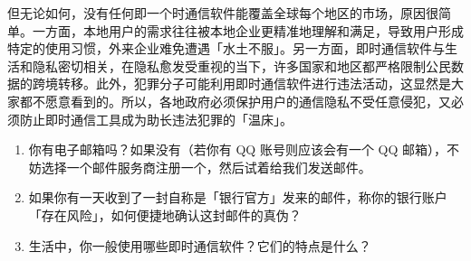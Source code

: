 但无论如何，没有任何即一个时通信软件能覆盖全球每个地区的市场，原因很简单。一方面，本地用户的需求往往被本地企业更精准地理解和满足，导致用户形成特定的使用习惯，外来企业难免遭遇「水土不服」。另一方面，即时通信软件与生活和隐私密切相关，在隐私愈发受重视的当下，许多国家和地区都严格限制公民数据的跨境转移。此外，犯罪分子可能利用即时通信软件进行违法活动，这显然是大家都不愿意看到的。所以，各地政府必须保护用户的通信隐私不受任意侵犯，又必须防止即时通信工具成为助长违法犯罪的「温床」。

\practice

\begin{enumerate}
  \item 你有电子邮箱吗？如果没有（若你有 QQ 账号则应该会有一个 QQ 邮箱），不妨选择一个邮件服务商注册一个，然后试着给我们发送邮件。
  \item 如果你有一天收到了一封自称是「银行官方」发来的邮件，称你的银行账户「存在风险」，如何便捷地确认这封邮件的真伪？
  \item 生活中，你一般使用哪些即时通信软件？它们的特点是什么？
\end{enumerate}
